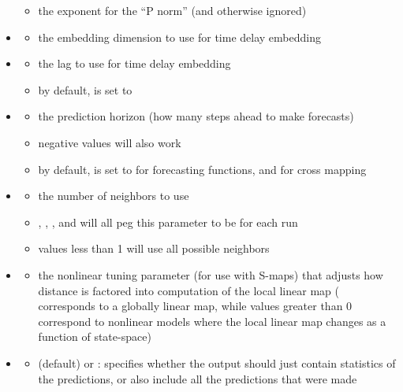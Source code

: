 \documentclass[article]{jss}
\begin{document}
\begin{itemize}
  \begin{itemize}
  \item the exponent for the ``P norm'' (and otherwise ignored)
  \end{itemize}
\item {}
  \begin{itemize}
  \item the embedding dimension to use for time delay embedding
  \end{itemize}
\item {}
  \begin{itemize}
  \item the lag to use for time delay embedding
  \item by default,  is set to 
  \end{itemize}
\item {}
  \begin{itemize}
  \item the prediction horizon (how many steps ahead to make forecasts)
  \item negative values will also work
  \item by default,  is set to  for forecasting functions, and  for cross mapping
  \end{itemize}
\item {}
  \begin{itemize}
  \item the number of neighbors to use
  \item {}, , , and  will all peg this parameter to be  for each run
  \item values less than 1 will use all possible neighbors
  \end{itemize}
\item {}
  \begin{itemize}
  \item the nonlinear tuning parameter (for use with S-maps) that adjusts how distance is factored into computation of the local linear map ( corresponds to a globally linear map, while values greater than 0 correspond to nonlinear models where the local linear map changes as a function of state-space)
  \end{itemize}
\item {}
  \begin{itemize}
  \item {} (default) or : specifies whether the output should just contain statistics of the predictions, or also include all the predictions that were made

\end{itemize}
\end{itemize}
\end{document}
